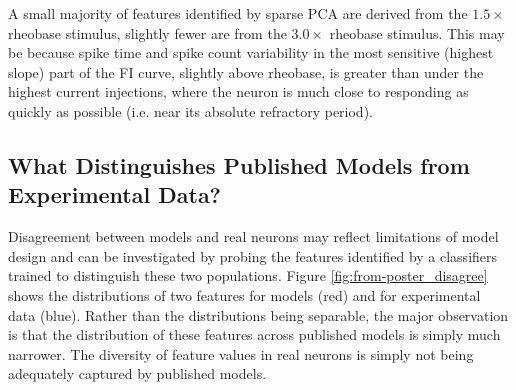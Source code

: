 


A small majority of features identified by sparse PCA are derived from the $1.5 \times$ rheobase stimulus, slightly fewer are from the $3.0\times$ rheobase stimulus.
This may be because spike time and spike count variability in the most sensitive (highest slope) part of the FI curve, slightly above rheobase, is greater than under the highest current injections, where the neuron is much close to responding as quickly as possible (i.e. near its absolute refractory period).

\subsection{What Distinguishes Published Models from Experimental Data?}
Disagreement between models and real neurons may reflect limitations of model design and can be investigated by probing the features identified by a classifiers trained to distinguish these two populations. 
Figure \ref{fig:from-poster_disagree} shows the distributions of two features for models (red) and for experimental data (blue).
Rather than the distributions being separable, the major observation is that the distribution of these features across published models is simply much narrower.
The diversity of feature values in real neurons is simply not being adequately captured by published models.

